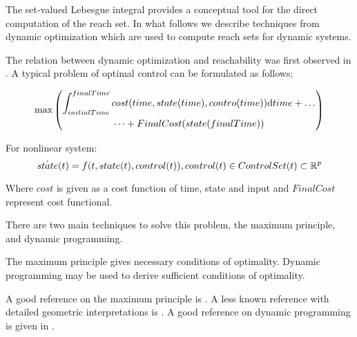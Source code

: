     The set-valued Lebesgue integral provides a conceptual tool for the direct computation of the reach set. In what follows we describe techniques from dynamic optimization which are used to compute reach sets for dynamic systems.

    The relation between dynamic optimization and reachability was first observed in \cite{leitmann1982optimality}. A typical problem of optimal control can be formulated as follows:

    \begin{equation}
        \max \left(
        \begin{gathered}
            \int_{initialTime}^{finalTime} cost(time,state(time),contro(time)) \textnormal{d}time + \dots \\ \dots +FinalCost(state(finalTime))\end{gathered}
        \right)
    \end{equation}
    
    \noindent For nonlinear system:
    \begin{equation}
        \dot{state}(t) = f(t,state(t),control(t)), control(t) \in ControlSet(t) \subset \R^p
    \end{equation}
    
    Where $cost$ is given as a cost function of time, state and input and $FinalCost$ represent cost functional.
    
    There are two main techniques to solve this problem, the maximum principle, and dynamic programming. 
    
    The maximum principle gives necessary conditions of optimality. Dynamic programming may be used to derive sufficient conditions of optimality.

    A good reference on the maximum principle is \cite{pontryagin1962ef}. A less known reference with detailed geometric interpretations is \cite{girsanov2012lectures}. A good reference on dynamic programming is given in  \cite{bardi2008optimal}.
    
